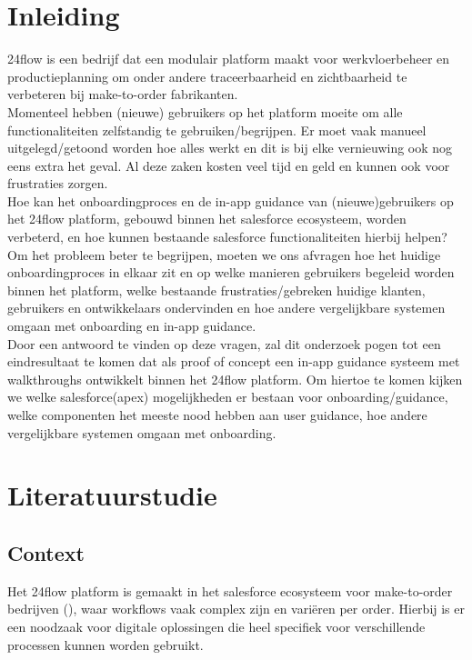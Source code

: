 
\section{Inleiding}%
\label{sec:inleiding}
24flow is een bedrijf dat een modulair platform maakt voor werkvloerbeheer en productieplanning om onder andere traceerbaarheid en zichtbaarheid te verbeteren bij make-to-order fabrikanten. 
\\

Momenteel hebben (nieuwe) gebruikers op het platform moeite om alle functionaliteiten zelfstandig te gebruiken/begrijpen. Er moet vaak manueel uitgelegd/getoond worden hoe alles werkt en dit is bij elke vernieuwing ook nog eens extra het geval. Al deze zaken kosten veel tijd en geld en kunnen ook voor frustraties zorgen.
\\

Hoe kan het onboardingproces en de in-app guidance van (nieuwe)gebruikers op het 24flow platform, gebouwd binnen het salesforce ecosysteem, worden verbeterd, en hoe kunnen bestaande salesforce functionaliteiten hierbij helpen?
\\

Om het probleem beter te begrijpen, moeten we ons afvragen hoe het huidige onboardingproces in elkaar zit en op welke manieren gebruikers begeleid worden binnen het platform, welke bestaande frustraties/gebreken huidige klanten, gebruikers en ontwikkelaars ondervinden en hoe andere vergelijkbare systemen omgaan met onboarding en in-app guidance.
\\

Door een antwoord te vinden op deze vragen, zal dit onderzoek pogen tot een eindresultaat te komen dat als proof of concept een in-app guidance systeem met walkthroughs ontwikkelt binnen het 24flow platform. Om hiertoe te komen kijken we welke salesforce(apex) mogelijkheden er bestaan voor onboarding/guidance, welke componenten het meeste nood hebben aan user guidance, hoe andere vergelijkbare systemen omgaan met onboarding.
 

\section{Literatuurstudie}%
\label{sec:literatuurstudie}
\subsection{Context}
Het 24flow platform is gemaakt in het salesforce ecosysteem voor make-to-order bedrijven (\autocite{Nelfiyanti2025}), waar workflows vaak complex zijn en variëren per order. Hierbij is er een noodzaak voor digitale oplossingen die heel specifiek voor verschillende processen kunnen worden gebruikt. 

